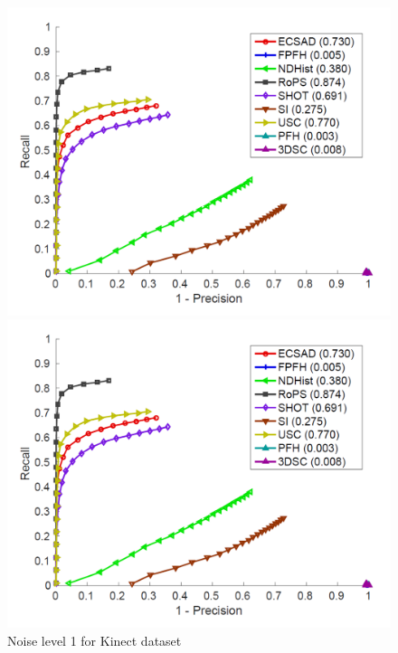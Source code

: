 \documentclass[10pt,twocolumn,letterpaper]{article}
\begin{document}
\begin{figure}[htp]
\centering
\begin{minipage}[b]{.3\textwidth}
\includegraphics[width=1.0\linewidth, height= 1.0\linewidth, keepaspectratio]{img/PRC_1.pdf} 
\caption{Noise level 1 for Kinect dataset}\label{fig:kinect_n1}
\end{minipage}\qquad
\begin{minipage}[b]{.3\textwidth}
\includegraphics[width=1.0\linewidth, height= 1.0\linewidth, keepaspectratio]{img/PRC_1.pdf}

\end{minipage}
\end{figure}
\end{document}
